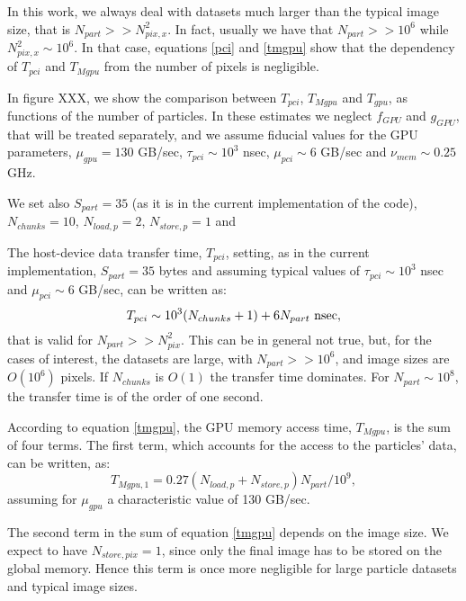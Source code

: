 \documentclass[11pt]{article}
\begin{document}
In this work, we always deal with datasets much larger than the typical image size,
that is $N_{part} >> N_{pix,x}^2$. In fact, usually we have that $N_{part} >> 10^6$
while $N_{pix,x}^2 \sim 10^6$. 
In that case,
equations \eqref{pci} and \eqref{tmgpu} show that the dependency of $T_{pci}$ and $T_{Mgpu}$ 
from the number of pixels is negligible. 

In figure XXX, we show the comparison between $T_{pci}$, $T_{Mgpu}$ and $T_{gpu}$, 
as functions of the number of particles. In these estimates we 
neglect $f_{GPU}$ and $g_{GPU}$, that will be treated separately, and we assume fiducial values 
for the GPU parameters, $\mu_{gpu} = 130$ GB/sec, $\tau_{pci} \sim 10^3$ nsec, 
$\mu_{pci} \sim 6$ GB/sec and $\nu_{mem} \sim 0.25$ GHz. 



We set also $S_{part} = 35$ (as it is in the current implementation of the code), 
$N_{chunks} = 10$, $N_{load,p} = 2$, $N_{store,p} = 1$ and 




The host-device data transfer time, $T_{pci}$, setting, as in the current implementation, 
$S_{part} = 35$ bytes and assuming typical values of 
$\tau_{pci} \sim 10^3$ nsec and $\mu_{pci} \sim 6$ GB/sec, can be written as:
\begin{equation}
T_{pci} \sim 10^3(N_{chunks} + 1) + 6 N_{part}\ {\rm nsec},
\end{equation}
that is valid for $N_{part} >> N_{pix}^2$. This can be in general not true, but, 
for the cases of interest, the datasets are large, with
$N_{part} >> 10^6$, and image sizes are $O(10^6)$ pixels.
If $N_{chunks}$ is $O(1)$ the transfer 
time dominates. For $N_{part}\sim 10^8$, the transfer time is of the order of
one second.

According to equation \eqref{tmgpu}, the GPU memory access time, $T_{Mgpu}$,  
is the sum of four terms. The first term, which accounts for the access to 
the particles' data, can be written, as:
\begin{equation}
T_{Mgpu,1} = 0.27 (N_{load,p} + N_{store,p})  N_{part} / 10^9,
\end{equation}
assuming for $\mu_{gpu}$ a characteristic value of 130 GB/sec. 

The second term in the sum of equation \eqref{tmgpu} 
depends on the image size. We expect to have  
$N_{store,pix} = 1$, since only the final image has to be stored
on the global memory. Hence this term is once more negligible
for large particle datasets and typical image sizes.
\end{document}
